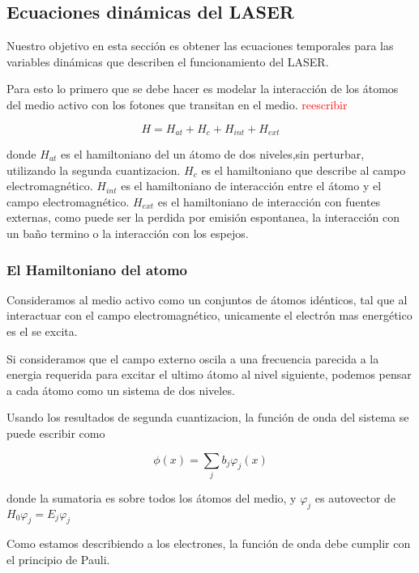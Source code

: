 \subsection{Ecuaciones dinámicas del LASER}

Nuestro objetivo en esta sección es obtener las ecuaciones temporales para las variables dinámicas que describen el funcionamiento del LASER.

Para esto lo primero que se debe hacer es modelar la interacción de los átomos del medio activo con los fotones que transitan en el medio.
\textcolor{red}{reescribir}





\begin{equation}
	H=H_{at}+H_{c}+H_{int}+H_{ext}
\end{equation}

donde $H_{at}$ es el hamiltoniano del un átomo de dos niveles,sin perturbar, utilizando la segunda cuantizacion. $H_{c}$ es el hamiltoniano que describe al campo electromagnético. 
$H_{int}$ es el hamiltoniano de interacción entre el átomo y el campo electromagnético.
$H_{ext}$ es el hamiltoniano de interacción con fuentes externas, como puede ser la perdida por emisión espontanea, la interacción con un ba\~{n}o termino  o la interacción con los espejos.

\subsubsection{El Hamiltoniano del atomo}

Consideramos al medio activo como un conjuntos de átomos idénticos, tal que al interactuar con el campo electromagnético, unicamente el electrón mas energético es el se excita. 

Si consideramos que el campo externo oscila a una frecuencia parecida  a la energia requerida para excitar el ultimo átomo al nivel siguiente, podemos pensar a cada átomo como un sistema de dos niveles.

Usando los resultados de segunda cuantizacion, la función de onda del sistema se puede escribir como 

\[ \phi(x)=\sum_j b_j \varphi_j(x)
\]

donde la sumatoria es sobre todos los átomos del medio, y $\varphi_j$ es autovector de $H_0\varphi_j=E_j\varphi_j$
 

Como estamos describiendo a los electrones, la función de onda debe cumplir con el principio de Pauli. 

